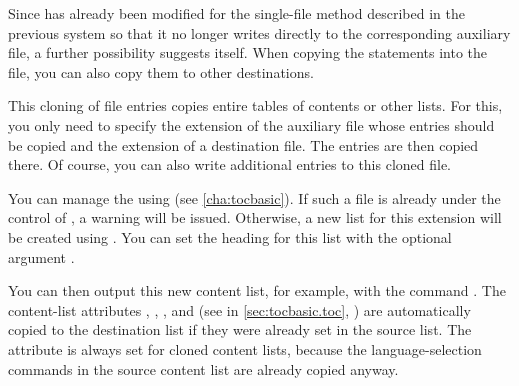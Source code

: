 Since  has already been modified for
the single-file method described in the previous system so that it no longer
writes directly to the corresponding auxiliary file, a further possibility
suggests itself. When copying the  statements into the
 file, you can also copy them to other destinations.

\begin{Declaration}
\end{Declaration}
This cloning of file entries copies entire tables of contents or other lists.
For this, you only need to specify the extension of the auxiliary file whose
entries should be copied and the extension of a destination file. The entries
are then copied there. Of course, you can also write additional entries to
this cloned file.

You can manage the  using
\hyperref[cha:tocbasic]{}%
 (see
\autoref{cha:tocbasic}). If such a file is already under the control of
\hyperref[cha:tocbasic]{}, a warning will be issued.
Otherwise, a new list for this extension will be created using
\hyperref[cha:tocbasic]{}. You can set the heading for this
list with the optional argument .

You can then output this new content list, for example, with the command
. The content-list
attributes
, , , and 
(see  in \autoref{sec:tocbasic.toc},
) are automatically copied to the
destination list if they were already set in the source list. The
 attribute is always set for cloned content lists, because the
language-selection commands in the source content list are already copied
anyway.

